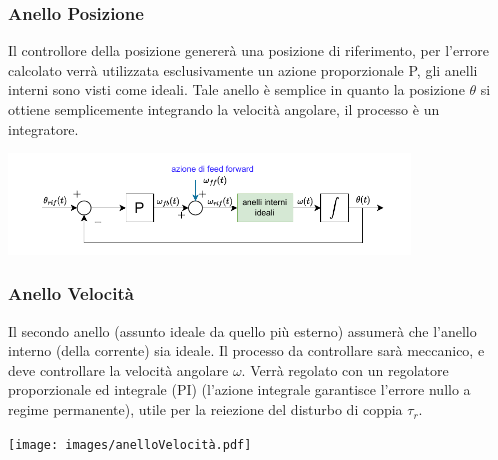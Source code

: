 \documentclass[10pt, letterpaper]{report}
\begin{document}
\subsubsection{Anello Posizione}
Il controllore della posizione genererà una posizione di riferimento, per l'errore calcolato verrà utilizzata esclusivamente un azione proporzionale P, gli anelli interni sono visti come ideali. Tale anello è semplice in quanto la posizione $\theta$ si ottiene semplicemente integrando la velocità angolare, il processo è un integratore.
\begin{center}
    \includegraphics[width=0.8\textwidth ]{images/anelloPosizione.pdf}
\end{center}
\subsubsection{Anello Velocità}
Il secondo anello (assunto ideale da quello più esterno) assumerà che l'anello interno (della corrente) sia ideale. Il processo da controllare sarà meccanico, e deve controllare la velocità angolare $\omega$. Verrà regolato con un regolatore proporzionale ed integrale (PI) (l'azione integrale garantisce l'errore nullo a regime permanente), utile per la reiezione del disturbo di coppia $\tau_r$.
\begin{center}
    \texttt{[image: images/anelloVelocità.pdf]}
\end{center}
\end{document}
